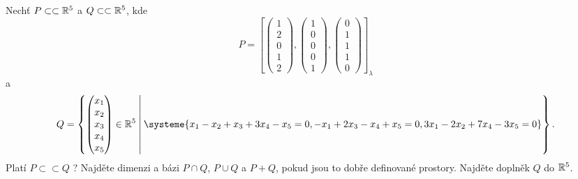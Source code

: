 \documentclass{article}
\newcommand{\mathfield}{\ensuremath{\mathbb}}
\newcommand{\subspace}{\ensuremath{\subset \subset}}
\begin{document}
\begin{Exercise}[name=Úkol, label=subspaces]
	Nechť \( P \subspace \mathfield{R}^5 \) a \( Q \subspace \mathfield{R}^5 \), kde
	\[
		P = \left[
			\begin{pmatrix} 1 \\ 2 \\ 0 \\ 1 \\ 2 \end{pmatrix},
			\begin{pmatrix} 1 \\ 0 \\ 0 \\ 0 \\ 1 \end{pmatrix},
			\begin{pmatrix} 0 \\ 1 \\ 1 \\ 1 \\ 0 \end{pmatrix}
		\right]_\lambda
	\]
	a
	\[
		Q = \left\{
			\begin{pmatrix} x_1 \\ x_2 \\ x_3 \\ x_4 \\ x_5 \end{pmatrix} \in \mathfield{R}^5
			\: \middle| \:
			\systeme{
				x_1 - x_2 +x_3 + 3x_4 -x_5 = 0,
				-x_1 + 2x_3 - x_4 + x_5 = 0,
				3x_1 - 2x_2 + 7x_4 - 3x_5 = 0
			}
		\right\} \text{.}
	\]
	\Question Platí \( P \subspace Q \) ?
	\Question Najděte dimenzi a bázi \( P \cap Q \), \( P \cup Q \) a \( P + Q \), pokud jsou to dobře definované prostory.
	\Question Najděte doplněk \( Q \) do \( \mathfield{R}^5 \).
\end{Exercise}
\end{document}
